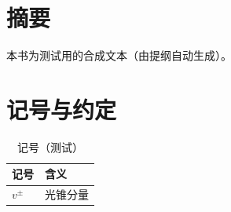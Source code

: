 \chapter*{摘要}
本书为测试用的合成文本（由提纲自动生成）。
\chapter*{记号与约定}
\begin{table}[htbp]\centering\caption{记号（测试）}\label{tab:front-notation}
\begin{tabular}{ll}\toprule 记号 & 含义\\\midrule $v^\pm$ & 光锥分量\\\bottomrule\end{tabular}\end{table}
